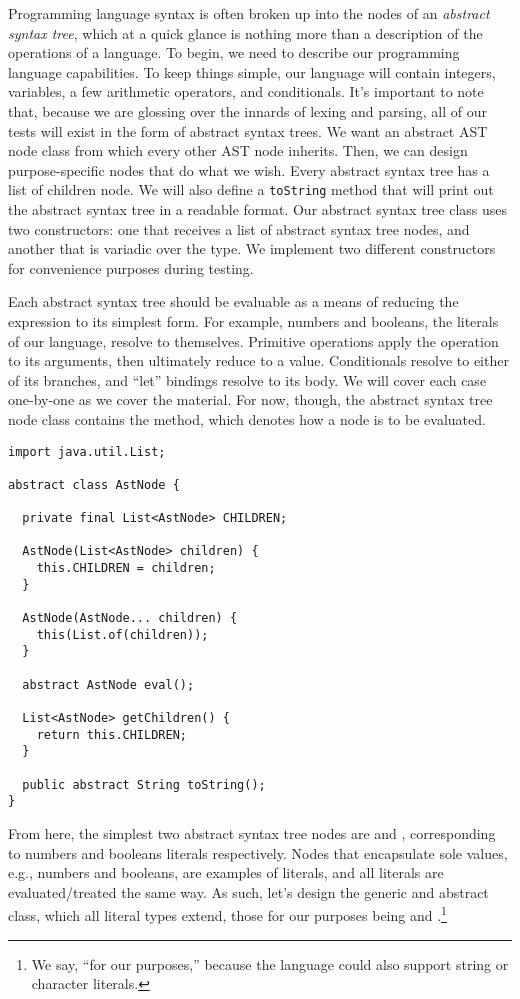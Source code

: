 Programming language syntax is often broken up into the nodes of an \emph{abstract syntax tree}, which at a quick glance is nothing more than a description of the operations of a language. To begin, we need to describe our programming language capabilities. 
To keep things simple, our language will contain integers, variables, a few arithmetic operators, and conditionals. 
It's important to note that, because we are glossing over the innards of lexing and  parsing, all of our tests will exist in the form of abstract syntax trees.
We want an abstract AST node class from which every other AST node inherits. Then, we can design purpose-specific nodes that do what we wish. 
Every abstract syntax tree has a list of children node. We will also define a \texttt{toString} method that will print out the abstract syntax tree in a readable format. 
Our abstract syntax tree class uses two constructors: one that receives a list of abstract syntax tree nodes, and another that is variadic over the  type. We implement two different constructors for convenience purposes during testing.

Each abstract syntax tree should be evaluable as a means of reducing the expression to its simplest form. For example, numbers and booleans, the literals of our language, resolve to themselves. Primitive operations apply the operation to its arguments, then ultimately reduce to a value. Conditionals resolve to either of its branches, and ``let'' bindings resolve to its body. We will cover each case one-by-one as we cover the material. For now, though, the abstract syntax tree node class contains the  method, which denotes how a node is to be evaluated.

\begin{lstlisting}[language=MyJava]
import java.util.List;

abstract class AstNode {

  private final List<AstNode> CHILDREN;  
 
  AstNode(List<AstNode> children) { 
    this.CHILDREN = children; 
  }

  AstNode(AstNode... children) { 
    this(List.of(children)); 
  }

  abstract AstNode eval();

  List<AstNode> getChildren() { 
    return this.CHILDREN; 
  }

  public abstract String toString();
}
\end{lstlisting}

From here, the simplest two abstract syntax tree nodes are  and , corresponding to numbers and booleans literals respectively.
Nodes that encapsulate sole values, e.g., numbers and booleans, are examples of literals, and all literals are evaluated/treated the same way.
As such, let's design the generic and abstract  class, which all literal types extend, those for our purposes being  and .\footnote{We say, ``for our purposes,'' because the language could also support string or character literals.}

